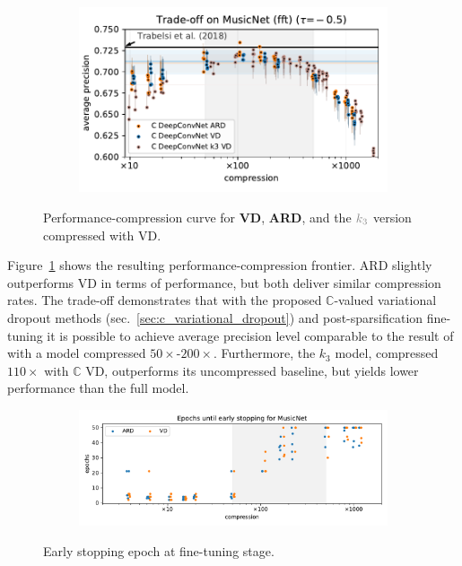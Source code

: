 \documentclass[a4paper,10pt,onecolumn]{article}
\newcommand{\cplx}{\mathbb{C}}
\begin{document}
\begin{figure}[!t]
  \centering
  \begin{subfigure}[b]{1.\columnwidth}  %
    \centering
    \includegraphics[width=\columnwidth]{figure__musicnet__trade-off/paper__musicnetram__fft__-0.5.pdf}
  \end{subfigure}
  \caption{%
    Performance-compression curve for \textbf{\color{blue} VD}, \textbf{\color{orange} ARD},
    and the ${\color{gray} k_3}$ version compressed with VD.
  }
  \label{fig:musicnet__trade-off}
\end{figure}

Figure~\ref{fig:musicnet__trade-off} shows the resulting performance-compression frontier.
ARD slightly outperforms VD in terms of performance, but both deliver similar compression
rates. The trade-off demonstrates that with the proposed $\cplx$-valued variational dropout
methods (sec.~\ref{sec:c_variational_dropout}) and post-sparsification fine-tuning it is
possible to achieve average precision level comparable to the result of \citet{trabelsi_deep_2017}
with a model compressed $50\times$-$200\times$. Furthermore, the $k_3$ model, compressed
$110 \times$ with $\cplx$ VD, outperforms its uncompressed baseline, but yields lower
performance than the full model.

\begin{figure}[!t]
  \centering
  \begin{subfigure}[b]{1.\columnwidth}  %
    \centering
    \includegraphics[width=\columnwidth]{figure__fine-tune_fx__early__compression.pdf}
  \end{subfigure}
  \caption{%
    Early stopping epoch at fine-tuning stage.
  }
  \label{fig:musicnet__early_stopping}
\end{figure}
\end{document}

